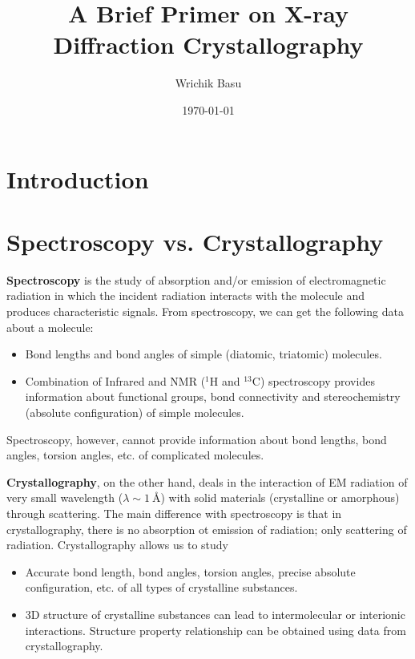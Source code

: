 \documentclass[11pt,a4paper]{article}
\begin{document}
	\title{A Brief Primer on X-ray Diffraction Crystallography}
	\author{Wrichik Basu}
	\date{\today}
	
	\maketitle
	
	\section{Introduction}
	
	\section{Spectroscopy vs. Crystallography}
	
		\textbf{Spectroscopy} is the study of absorption and/or emission of electromagnetic radiation in which the incident radiation interacts with the molecule and produces characteristic signals. From spectroscopy, we can get the following data about a molecule: %
%			
			\begin{itemize}%
%		
			    \item Bond lengths and bond angles of simple (diatomic, triatomic) molecules.
			    
			    \item Combination of Infrared and NMR (${}^1 \mathrm{H}$ and ${}^{13} \mathrm{C}$) spectroscopy provides information about functional groups, bond connectivity and stereochemistry (absolute configuration) of simple molecules.
		    
		    \end{itemize}
		    
		Spectroscopy, however, cannot provide information about bond lengths, bond angles, torsion angles, etc. of complicated molecules.
		
		\textbf{Crystallography}, on the other hand, deals in the interaction of EM radiation of very small wavelength ($\lambda \sim \SI{1}{\angstrom}$) with solid materials (crystalline or amorphous) through scattering. The main difference with spectroscopy is that in crystallography, there is no absorption ot emission of radiation; only scattering of radiation. Crystallography allows us to study%
%			
			\begin{itemize}%
%			
			    \item Accurate bond length, bond angles, torsion angles, precise absolute configuration, etc. of all types of crystalline substances.
			    
			    \item 3D structure of crystalline substances can lead to intermolecular or interionic interactions. Structure property relationship can be obtained using data from crystallography.
			    
			\end{itemize}
			
\end{document}
